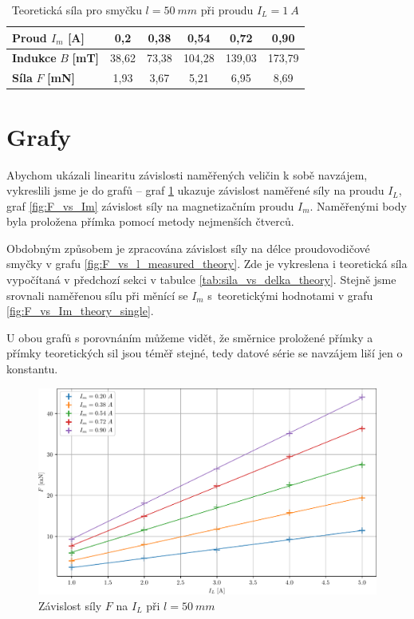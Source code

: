 \documentclass[a4paper,12pt]{article}
\begin{document}
\begin{table}[H]
    \centering
    \renewcommand{\arraystretch}{1.4}
    \begin{tabular}{|l|c|c|c|c|c|}
        \hline
        \textbf{Proud} $I_m$ \textbf{[A]} & 0,2 & 0,38 & 0,54 & 0,72 & 0,90 \\ \hline
        \textbf{Indukce} $B$ \textbf{[mT]} & 38,62 & 73,38 & 104,28 & 139,03 & 173,79 \\ \hline
        \textbf{Síla} $F$ \textbf{[mN]} & 1,93 & 3,67 & 5,21 & 6,95 & 8,69 \\ \hline
    \end{tabular}
    \caption{Teoretická síla pro smyčku $l=50\ mm$ při proudu $I_L=1\ A$}
    \label{tab:sila_vs_Im_theory}
\end{table}

\section{Grafy}
Abychom ukázali linearitu závislosti naměřených veličin k sobě navzájem, vykreslili jsme je do grafů -- graf \ref{fig:F_vs_Il} ukazuje závislost naměřené síly na proudu $I_L$, graf \ref{fig:F_vs_Im} závislost síly na magnetizačním proudu $I_m$. Naměřenými body byla proložena přímka pomocí metody nejmenších čtverců. 

Obdobným způsobem je zpracována závislost síly na délce proudovodičové smyčky v grafu \ref{fig:F_vs_l_measured_theory}. Zde je vykreslena i teoretická síla vypočítaná v předchozí sekci v tabulce \ref{tab:sila_vs_delka_theory}. Stejně jsme srovnali naměřenou sílu při měnící se $I_m$ s~teoretickými hodnotami v grafu \ref{fig:F_vs_Im_theory_single}.

U obou grafů s porovnáním můžeme vidět, že směrnice proložené přímky a přímky teoretických sil jsou téměř stejné, tedy datové série se navzájem liší jen o konstantu.

\begin{figure}[H]
    \centering
    \includegraphics[width=1\textwidth]{img/F_vs_Il.pdf}
    \caption{Závislost síly $F$ na $I_L$ při $l=50\ mm$}
    \label{fig:F_vs_Il}
\end{figure}
\end{document}
